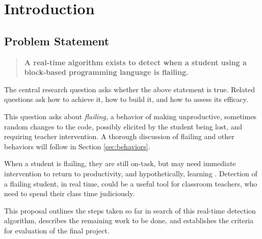 \chapter{Introduction}

 
\section{Problem Statement} \label{sec:problem-statement}
\begin{quote}
\textbf{A real-time algorithm exists to detect when a student using a block-based programming language is flailing.}
\end{quote}

The central research question asks whether the above statement is true. Related questions ask how to achieve it, how to build it, and how to assess its efficacy.

This question asks about \emph{flailing,} a behavior of making unproductive, sometimes random changes to the code, possibly elicited by the student being lost, and requiring teacher intervention. A thorough discussion of flailing and other behaviors will follow in Section \ref{sec:behaviors}.

When a student is flailing, they are still on-task, but may need immediate intervention to return to productivity, and hypothetically, learning \citep{baker2004off, perkins-1986}. Detection of a flailing student, in real time, could be a useful tool for classroom teachers, who need to spend their class time judiciously. 

This proposal outlines the steps taken so far in search of this real-time detection algorithm, describes the remaining work to be done, and establishes the criteria for evaluation of the final project.



